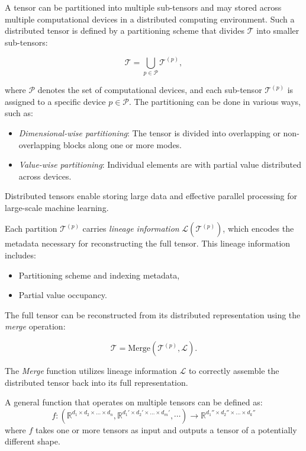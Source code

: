 A tensor can be partitioned into multiple sub-tensors
and may stored across multiple computational devices
in a distributed computing environment.
Such a distributed tensor is defined by a partitioning scheme that divides
$\mathcal{T}$ into smaller sub-tensors:

\begin{equation}
\mathcal{T} = \bigcup_{p \in \mathcal{P}} \mathcal{T}^{(p)},
\end{equation}

where $\mathcal{P}$ denotes the set of computational devices, and each sub-tensor $\mathcal{T}^{(p)}$ is assigned to a specific device $p \in \mathcal{P}$. The partitioning can be done in various ways, such as:

\begin{itemize}
    \item \emph{Dimensional-wise partitioning}: The tensor is divided into overlapping or non-overlapping blocks along one or more modes.
    \item \emph{Value-wise partitioning}: Individual elements are with partial value distributed across devices.
\end{itemize}

Distributed tensors enable storing large data and effective parallel processing
for large-scale machine learning.


Each partition $\mathcal{T}^{(p)}$ carries \textit{lineage information}
$\mathcal{L}(\mathcal{T}^{(p)})$, which encodes the metadata necessary for
reconstructing the full tensor. This lineage information includes:

\begin{itemize}
    \item Partitioning scheme and indexing metadata,
    \item Partial value occupancy.
\end{itemize}

The full tensor can be reconstructed from its distributed representation using
the \textit{merge} operation:

\begin{equation}
    \mathcal{T} = \text{Merge}(\mathcal{T}^{(p)}, \mathcal{L}).
\end{equation}

The \textit{Merge} function utilizes lineage information $\mathcal{L}$ to
correctly assemble the distributed tensor back into its full representation.


\begin{definition}[Functions]
A general function that operates on multiple tensors can be defined as:
\begin{equation}
f: (\mathbb{R}^{d_1 \times d_2 \times \dots \times d_n}, \mathbb{R}^{d_1' \times d_2' \times \dots \times d_m'}, \cdots) \to \mathbb{R}^{d_1'' \times d_2'' \times \dots \times d_k''}
\end{equation}
where $f$ takes one or more tensors as input and outputs a tensor of a potentially different shape.
\end{definition}


